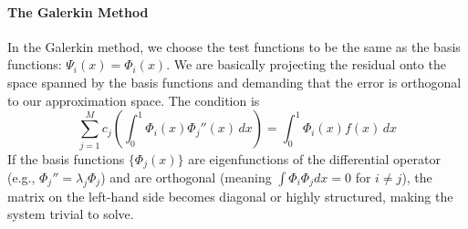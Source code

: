 \paragraph*{The Galerkin Method}

In the Galerkin method, we choose the test functions to be the same as the basis functions: $\Psi_i(x) = \Phi_i(x)$. We are basically projecting the residual onto the space spanned by the basis functions and demanding that the error is orthogonal to our approximation space. The condition is
\begin{equation}
    \sum_{j=1}^M c_j \left( \int_0^1 \Phi_i(x) \Phi_j''(x) \, dx \right) = \int_0^1 \Phi_i(x) f(x) \, dx
\end{equation}
If the basis functions $\{\Phi_j(x)\}$ are eigenfunctions of the differential operator (e.g., $\Phi_j'' = \lambda_j \Phi_j$) and are orthogonal (meaning $\int \Phi_i \Phi_j dx = 0$ for $i \neq j$), the matrix on the left-hand side becomes diagonal or highly structured, making the system trivial to solve.

